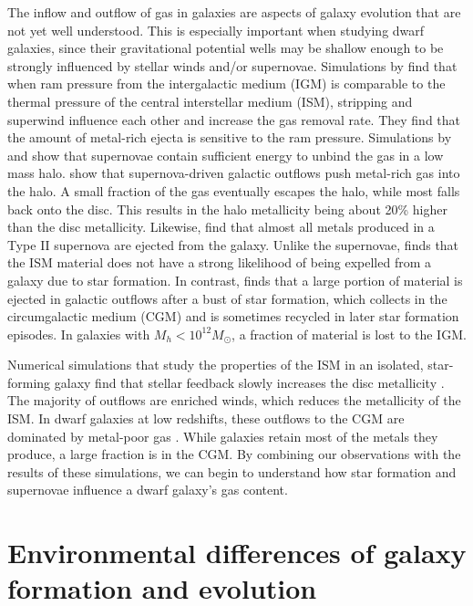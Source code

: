 The inflow and outflow of gas in galaxies are aspects of galaxy evolution that 
are not yet well understood.  This is especially important when studying dwarf 
galaxies, since their gravitational potential wells may be shallow enough to be 
strongly influenced by stellar winds and/or supernovae.  Simulations by 
\cite{Marcolini04} find that when ram pressure from the intergalactic medium 
(IGM) is comparable to the thermal pressure of the central interstellar medium 
(ISM), stripping and superwind influence each other and increase the gas removal 
rate.  They find that the amount of metal-rich ejecta is sensitive to the ram 
pressure.  
Simulations by \cite{Power14} and \cite{Melioli15} show that supernovae contain 
sufficient energy to unbind the gas in a low mass halo.  \cite{Hu16} show that 
supernova-driven galactic outflows push metal-rich gas into the halo.  A small 
fraction of the gas eventually escapes the halo, while most falls back onto the 
disc.  This results in the halo metallicity being about 20\% higher than the 
disc metallicity.  Likewise, \cite{Muratov17} find that almost all metals 
produced in a Type II supernova are ejected from the galaxy.
Unlike the supernovae, \cite{Melioli15} finds that the ISM material does not 
have a strong likelihood of being expelled from a galaxy due to star formation.  
In contrast, \cite{Muratov15} finds that a large portion of material is ejected 
in galactic outflows after a bust of star formation, which collects in the 
circumgalactic medium (CGM) and is sometimes recycled in later star formation 
episodes.  In galaxies with $M_h < 10^{12} M_\odot$, a fraction of material is 
lost to the IGM.

Numerical simulations that study the properties of the ISM in an isolated, 
star-forming galaxy find that stellar feedback slowly increases the disc 
metallicity \citep{Hu16}.  The majority of outflows are enriched winds, which 
reduces the metallicity of the ISM.  In dwarf galaxies at low redshifts, these 
outflows to the CGM are dominated by metal-poor gas \citep{Muratov17}.  While 
galaxies retain most of the metals they produce, a large fraction is in the CGM.  
By combining our observations with the results of these simulations, we can 
begin to understand how star formation and supernovae influence a dwarf galaxy's 
gas content.


\section[Environmental differences]{Environmental differences of galaxy formation and evolution}

